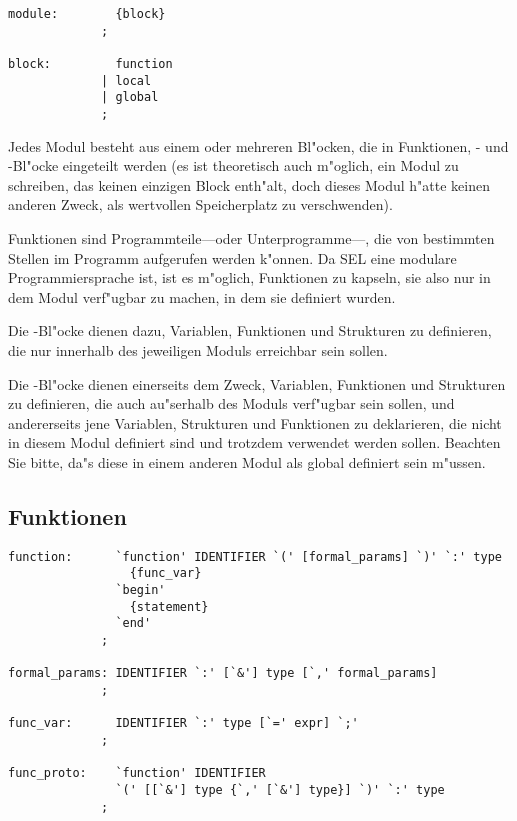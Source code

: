 \begin{verbatim}
module:        {block}
             ;

block:         function
             | local
             | global
             ;
\end{verbatim}

Jedes Modul besteht aus einem oder mehreren Bl"ocken,
die in Funktionen, - und -Bl"ocke
eingeteilt werden (es ist theoretisch auch m"oglich, ein Modul zu
schreiben, das keinen einzigen Block enth"alt, doch dieses Modul
h"atte keinen anderen Zweck, als wertvollen Speicherplatz zu
verschwenden).

Funktionen sind Programmteile---oder Unterprogramme---, die von
bestimmten Stellen im Programm aufgerufen werden k"onnen. Da SEL
eine modulare Programmiersprache ist, ist es m"oglich, Funktionen
zu kapseln, sie also nur in dem Modul verf"ugbar zu machen, in
dem sie definiert wurden.

Die -Bl"ocke dienen dazu, Variablen,
Funktionen
und Strukturen
zu definieren, die nur innerhalb des jeweiligen Moduls
erreichbar sein sollen.

Die -Bl"ocke dienen einerseits dem Zweck, Variablen,
Funktionen
und Strukturen zu definieren, die auch au"serhalb des Moduls
verf"ugbar sein sollen, und andererseits jene Variablen,
Strukturen und Funktionen zu deklarieren, die nicht in diesem
Modul definiert sind und trotzdem verwendet werden sollen.
Beachten Sie bitte, da"s diese in einem anderen Modul
als global definiert sein m"ussen.

\subsection{Funktionen}

\begin{verbatim}
function:      `function' IDENTIFIER `(' [formal_params] `)' `:' type
                 {func_var}
               `begin'
                 {statement}
               `end'
             ;

formal_params: IDENTIFIER `:' [`&'] type [`,' formal_params]
             ;

func_var:      IDENTIFIER `:' type [`=' expr] `;'
             ;

func_proto:    `function' IDENTIFIER
               `(' [[`&'] type {`,' [`&'] type}] `)' `:' type
             ;
\end{verbatim}

